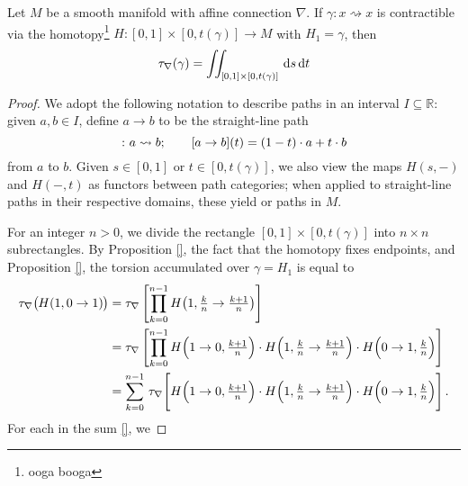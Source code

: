 \begin{theorem}
  Let $M$ be a smooth manifold with affine connection $\nabla$. If $\gamma \colon x \rightsquigarrow x$ is contractible via the homotopy\footnote{ooga booga} $H \colon [0, 1] \times [0, t(\gamma)] \to M$ with $H_1 = \gamma$, then 
  \begin{equation}
    \tau_\nabla (\gamma) = \iint_{[0, 1] \times [0, t(\gamma)]} \, {\rm d} s\, {\rm d} t 
  \end{equation}
\end{theorem}
\begin{proof}
  We adopt the following notation to describe paths in an interval $I \subseteq \mathbb{R}$: given $a, b \in I$, define $a \to b$ to be the straight-line path
  \begin{equation}
    [a \to b] \colon a \rightsquigarrow b; \quad \quad [\hspace{-0.25pt}a \to b](t) = (1-t) \cdot a + t \cdot b
  \end{equation} 
  from $a$ to $b$. Given $s \in [0, 1]$ or $t \in [0, t(\gamma)]$, we also view the maps $H(s, -)$ and $H(-, t)$ as functors between path categories; when applied to straight-line paths in their respective domains, these yield  or  paths in $M$.


  For an integer $n > 0$, we divide the rectangle $[0, 1] \times [0, t(\gamma)]$ into $n \times n$ subrectangles. By Proposition \ref{}, the fact that the homotopy fixes endpoints, and Proposition \ref{}, the torsion accumulated over $\gamma = H_1$ is equal to 
  \begin{align}
  \tau_\nabla \big(\hspace{-0.5pt}H(1, 0 \to 1)\hspace{-0.5pt}\big) 
  &= \tau_\nabla \left[\prod_{k = 0}^{n-1} H\big(1, \tfrac{k}{n} \to \tfrac{k + 1}{n}\big)\right] \\
  &= \tau_\nabla \left[\prod_{k = 0}^{n-1} H\Big(1 \to 0, \tfrac{k+1}{n}\Big) \cdot  H\Big(1, \tfrac{k}{n} \to \tfrac{k + 1}{n}\Big) \cdot H\Big(0 \to 1, \tfrac{k}{n}\Big)\right] \\
  &= \sum_{k=0}^{n- 1} \,\tau_\nabla \! \left[\vphantom{\prod^{n-1}}H\Big(1 \to 0, \tfrac{k+1}{n}\Big) \cdot  H\Big(1, \tfrac{k}{n} \to \tfrac{k + 1}{n}\Big) \cdot H\Big(0 \to 1, \tfrac{k}{n}\Big)\right].
  \end{align}
  For each  in the sum \ref{}, we 
\end{proof}
